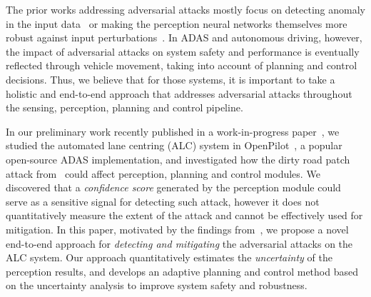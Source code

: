 \documentclass[letterpaper, 10 pt, conference]{ieeeconf}
\begin{document}
The prior works addressing adversarial attacks mostly focus on detecting anomaly in the input  data~\cite{kimin2018simple,zheng2018robust,lu2017safetynet,yin2020adversarial}
or making the perception neural networks themselves more robust against input perturbations~\cite{goodfellow2015explaining,madry2019deep,carlini2017towards}. In ADAS and autonomous driving, however, the impact of adversarial attacks on system safety and performance is eventually reflected through vehicle movement, taking into account of planning and control decisions. Thus, we believe that for those systems, it is important to take a holistic and end-to-end approach that addresses adversarial attacks throughout the sensing, perception, planning and control pipeline.

In our preliminary work recently published in a work-in-progress paper~\cite{liang2021endtoend}, we studied the automated lane centring (ALC) system in OpenPilot~\cite{openpilot}, a popular open-source ADAS implementation, and investigated how the dirty road patch attack from~\cite{sato2020hold} could affect perception, planning and control modules. We discovered that a \emph{confidence score} generated by the perception module could serve as a sensitive signal for detecting such attack, however it does not quantitatively measure the extent of the attack and cannot be effectively used for mitigation. In this paper, motivated by the findings from~\cite{liang2021endtoend}, we propose a novel end-to-end approach for \emph{detecting and mitigating} the adversarial attacks on the ALC system. Our approach quantitatively estimates the \emph{uncertainty} of the perception results, and develops an adaptive planning and control method based on the uncertainty analysis to improve system safety and robustness.  
\end{document}
